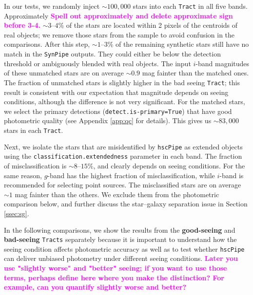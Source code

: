 \documentclass[useamsfonts]{pasj01}
\def\hscpipe{\texttt{hscPipe}}
\def\synpipe{\texttt{SynPipe}}
\def\tract{\texttt{Tract}}
\def\tracts{\texttt{Tracts}}
\newcommand{\susan}[1]{\textcolor{magenta} {\textbf{#1}}}
\begin{document}
    In our tests, we randomly inject ${\sim}100,000$ stars into each \tract{} in all
    five bands. Approximately \susan{Spell out approximately and delete approximate sign before 3-4.}
 ${\sim}3$--$4$\% of the stars are located within 2 pixels of the centroids
    of real objects; we remove those stars from the sample to avoid confusion in the comparisons.
    After this step, ${\sim}1$--$3$\% of the remaining synthetic stars still have no match in the \synpipe{} outputs.
    They could either be below the detection threshold or ambiguously blended with real objects.
    The input $i$-band magnitudes of these unmatched stars are on average ${\sim}0.9$
    mag fainter than the matched ones.
    The fraction of unmatched stars is slightly higher in the bad seeing \tract{}; this result is consistent with our expectation that magnitude depends on seeing conditions,
    although the difference is not very significant.
    For the matched stars, we select the primary detections
    (\texttt{detect.is-primary=True}) that have good photometric quality
    (see Appendix \ref{app:qc} for details).
    This gives us ${\sim}83,000$ stars in each \tract{}.

    Next, we isolate the stars that are misidentified by \hscpipe{} as extended
    objects using the \texttt{classification.extendedness} parameter in each band.
    The fraction of misclassification is ${\sim}8$--$15$\%, and clearly depends on
    seeing conditions.
    For the same reason, $g$-band has the highest fraction of misclassification,
    while $i$-band is recommended for selecting point sources.
    The misclassified stars are on average ${\sim}1$ mag fainter than the others.
    We exclude them from the photometric comparison below, and further discuss
    the star--galaxy separation issue in Section \ref{ssec:sg}.

    In the following comparisons, we show the results from the
    \textbf{good-seeing} and \textbf{bad-seeing} \tracts{} separately because it
    is important to understand how the seeing condition affects photometric accuracy as well as to test whether \hscpipe{} can deliver unbiased photometry under different  seeing conditions. \susan{Later you use "slightly worse" and "better" seeing; if you want to use those terms, perhaps define here where you make the distinction? For example, can you quantify slightly worse and better?}
\end{document}
